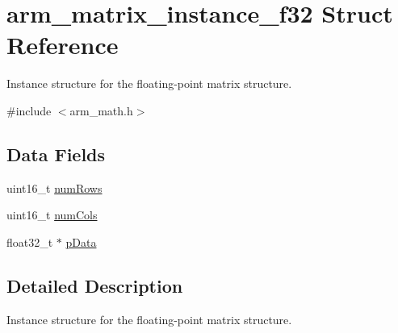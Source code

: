 \hypertarget{structarm__matrix__instance__f32}{\section{arm\-\_\-matrix\-\_\-instance\-\_\-f32 Struct Reference}
\label{structarm__matrix__instance__f32}
}


Instance structure for the floating-\/point matrix structure.  




{\ttfamily \#include $<$arm\-\_\-math.\-h$>$}

\subsection*{Data Fields}
\begin{DoxyCompactItemize}
\item 
uint16\-\_\-t \hyperlink{structarm__matrix__instance__f32_a1bcf80ccdc2acc29198f1592ae300390}{num\-Rows}
\item 
uint16\-\_\-t \hyperlink{structarm__matrix__instance__f32_a4bb5ec0d13eb4c9cf887aa8366a44117}{num\-Cols}
\item 
float32\-\_\-t $\ast$ \hyperlink{structarm__matrix__instance__f32_af5c3a2f15c98850cdcfbe6f87e5ac5df}{p\-Data}
\end{DoxyCompactItemize}


\subsection{Detailed Description}
Instance structure for the floating-\/point matrix structure. 

